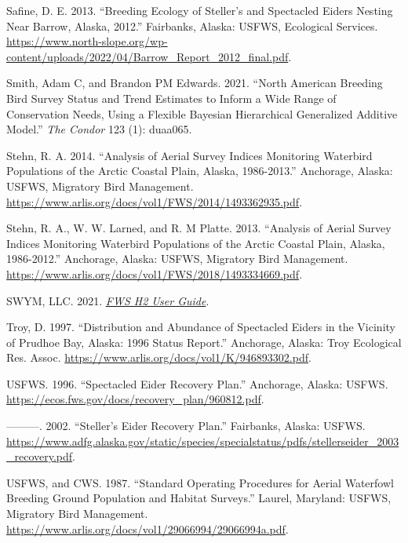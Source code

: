 \documentclass[
]{article}
\newlength{\cslhangindent}
\newenvironment{CSLReferences}[2] %
 {\begin{list}{}{%
  \setlength{\itemindent}{0pt}
  \setlength{\leftmargin}{0pt}
  \setlength{\parsep}{0pt}
  \ifodd #1
   \setlength{\leftmargin}{\cslhangindent}
   \setlength{\itemindent}{-1\cslhangindent}
  \fi
  \setlength{\itemsep}{#2\baselineskip}}}
 {\end{list}}
\begin{document}
\begin{CSLReferences}{1}{0}
Safine, D. E. 2013. {``Breeding Ecology of Steller's and Spectacled
Eiders Nesting Near Barrow, Alaska, 2012.''} Fairbanks, Alaska: USFWS,
Ecological Services.
\url{https://www.north-slope.org/wp-content/uploads/2022/04/Barrow_Report_2012_final.pdf}.

Smith, Adam C, and Brandon PM Edwards. 2021. {``North American Breeding
Bird Survey Status and Trend Estimates to Inform a Wide Range of
Conservation Needs, Using a Flexible Bayesian Hierarchical Generalized
Additive Model.''} \emph{The Condor} 123 (1): duaa065.

Stehn, R. A. 2014. {``Analysis of Aerial Survey Indices Monitoring
Waterbird Populations of the Arctic Coastal Plain, Alaska, 1986-2013.''}
Anchorage, Alaska: USFWS, Migratory Bird Management.
\url{https://www.arlis.org/docs/vol1/FWS/2014/1493362935.pdf}.

Stehn, R. A., W. W. Larned, and R. M Platte. 2013. {``Analysis of Aerial
Survey Indices Monitoring Waterbird Populations of the Arctic Coastal
Plain, Alaska, 1986-2012.''} Anchorage, Alaska: USFWS, Migratory Bird
Management.
\url{https://www.arlis.org/docs/vol1/FWS/2018/1493334669.pdf}.

SWYM, LLC. 2021. \emph{\href{}{FWS H2 User Guide}}.

Troy, D. 1997. {``Distribution and Abundance of Spectacled Eiders in the
Vicinity of Prudhoe Bay, Alaska: 1996 Status Report.''} Anchorage,
Alaska: Troy Ecological Res. Assoc.
\url{https://www.arlis.org/docs/vol1/K/946893302.pdf}.

USFWS. 1996. {``Spectacled Eider Recovery Plan.''} Anchorage, Alaska:
USFWS. \url{https://ecos.fws.gov/docs/recovery_plan/960812.pdf}.

---------. 2002. {``Steller's Eider Recovery Plan.''} Fairbanks, Alaska:
USFWS.
\url{https://www.adfg.alaska.gov/static/species/specialstatus/pdfs/stellerseider_2003_recovery.pdf}.

USFWS, and CWS. 1987. {``Standard Operating Procedures for Aerial
Waterfowl Breeding Ground Population and Habitat Surveys.''} Laurel,
Maryland: USFWS, Migratory Bird Management.
\url{https://www.arlis.org/docs/vol1/29066994/29066994a.pdf}.


\end{CSLReferences}
\end{document}
